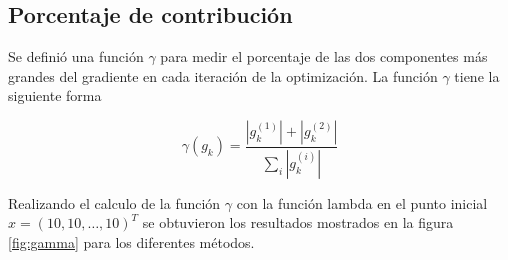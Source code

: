 \subsection*{Porcentaje de contribución}

Se definió una función $\gamma$ para medir el porcentaje de las dos componentes más grandes del gradiente en cada iteración de la optimización. La función $\gamma$ tiene la siguiente forma

\begin{equation*}
    \gamma(g_k) = \frac{|g_k^{(1)}|+|g_k^{(2)}|}{\sum\limits_i |g_k^{(i)}|}
\end{equation*}

Realizando el calculo de la función $\gamma$ con la función lambda en el punto inicial $x=(10,10,\dots,10)^T$ se obtuvieron los resultados mostrados en la figura \ref{fig:gamma} para los diferentes métodos.

